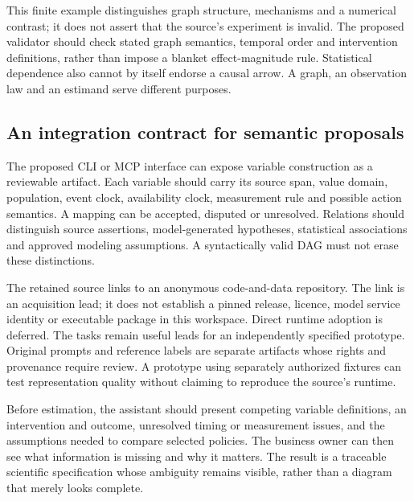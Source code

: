 This finite example distinguishes graph structure, mechanisms and a numerical contrast; it does not assert that the source's experiment is invalid. The proposed validator should check stated graph semantics, temporal order and intervention definitions, rather than impose a blanket effect-magnitude rule. Statistical dependence also cannot by itself endorse a causal arrow. A graph, an observation law and an estimand serve different purposes.

\subsection{An integration contract for semantic proposals}

The proposed CLI or MCP interface can expose variable construction as a reviewable artifact. Each variable should carry its source span, value domain, population, event clock, availability clock, measurement rule and possible action semantics. A mapping can be accepted, disputed or unresolved. Relations should distinguish source assertions, model-generated hypotheses, statistical associations and approved modeling assumptions. A syntactically valid DAG must not erase these distinctions.

The retained source links to an anonymous code-and-data repository. The link is an acquisition lead; it does not establish a pinned release, licence, model service identity or executable package in this workspace. Direct runtime adoption is deferred. The tasks remain useful leads for an independently specified prototype. Original prompts and reference labels are separate artifacts whose rights and provenance require review. A prototype using separately authorized fixtures can test representation quality without claiming to reproduce the source's runtime.

Before estimation, the assistant should present competing variable definitions, an intervention and outcome, unresolved timing or measurement issues, and the assumptions needed to compare selected policies. The business owner can then see what information is missing and why it matters. The result is a traceable scientific specification whose ambiguity remains visible, rather than a diagram that merely looks complete.
